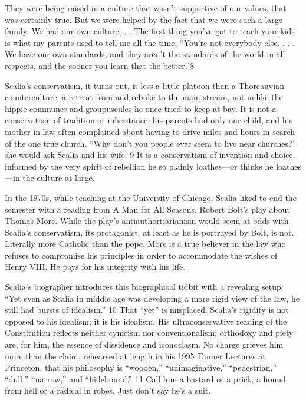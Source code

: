  \par 
They were being raised in a culture that wasn’t supportive of our values, that was certainly true. But we were helped by the fact that we were such a large family. We had our own culture. . . The first thing you’ve got to teach your kids is what my parents used to tell me all the time, “You’re not everybody else. . . . We have our own standards, and they aren’t the standards of the world in all respects, and the sooner you learn that the better.”{\color{blue}8}
 \par 
Scalia’s conservatism, it turns out, is less a little platoon than a Thoreauvian counterculture, a retreat from and rebuke to the main-stream, not unlike the hippie communes and groupuscules he once tried to keep at bay. It is not a conservatism of tradition or inheritance: his parents had only one child, and his mother-in-law often complained about having to drive miles and hours in search of the one true church. “Why don’t you people ever seem to live near churches?” she would ask Scalia and his wife. {\color{blue}9} It is a conservatism of invention and choice, informed by the very spirit of rebellion he so plainly loathes—or thinks he loathes—in the culture at large.
 \par 
In the 1970s, while teaching at the University of Chicago, Scalia liked to end the semester with a reading from A Man for All Seasons, Robert Bolt’s play about Thomas More. While the play’s antiauthoritarianism would seem at odds with Scalia’s conservatism, its protagonist, at least as he is portrayed by Bolt, is not. Literally more Catholic than the pope, More is a true believer in the law who refuses to compromise his principles in order to accommodate the wishes of Henry VIII. He pays for his integrity with his life.
 \par 
Scalia’s biographer introduces this biographical tidbit with a revealing setup: “Yet even as Scalia in middle age was developing a more rigid view of the law, he still had bursts of idealism.” {\color{blue}10} That “yet” is misplaced. Scalia’s rigidity is not opposed to his idealism; it is his idealism. His ultraconservative reading of the Constitution reflects neither cynicism nor conventionalism; orthodoxy and piety are, for him, the essence of dissidence and iconoclasm. No charge grieves him more than the claim, rehearsed at length in his 1995 Tanner Lectures at Princeton, that his philosophy is “wooden,” “unimaginative,” “pedestrian,” “dull,” “narrow,” and “hidebound.” {\color{blue}11} Call him a bastard or a prick, a hound from hell or a radical in robes. Just don’t say he’s a suit.
